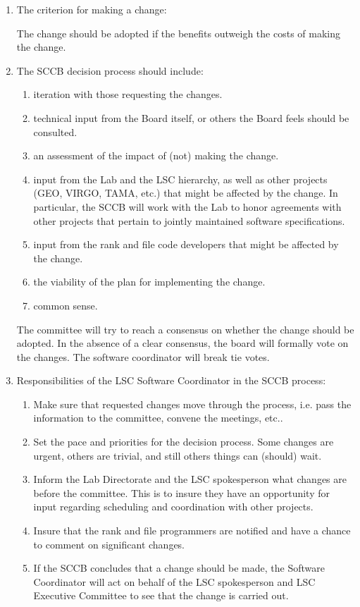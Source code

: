 \documentclass[]{ligodcc}
\begin{document}
\begin{enumerate}
\item
The criterion for making a change:

The change should be adopted if the benefits outweigh the costs of
making the change.

\item
The SCCB decision process should include:
\begin{enumerate}
   \item
   iteration with those requesting the changes.
   \item
   technical input from the Board itself, or others 
   the Board feels should be consulted.
   \item
   an assessment of the impact of (not) making the change. 
   \item
   input from the Lab and the LSC hierarchy, as well as 
   other projects (GEO, VIRGO, TAMA, etc.) that might be affected 
   by the change. In particular, the SCCB will work with the Lab to honor 
   agreements with other projects that pertain to jointly maintained
   software specifications.
   \item
   input from the rank and file code developers that might be affected
   by the change.
   \item
   the viability of the plan for implementing the change.
   \item
   common sense.
\end{enumerate}

The committee will try to reach a consensus on whether the change
should be adopted.  In the absence of a clear consensus, the board
will formally vote on the changes. The software coordinator will break
tie votes.

\item
Responsibilities of the LSC Software Coordinator in the SCCB process:
\begin{enumerate}
   \item
   Make sure that requested changes move through the process, i.e. 
   pass the information to the committee, convene the meetings, etc..
   \item
   Set the pace and priorities for the decision process. Some changes are 
   urgent, others are trivial, and still others things can (should) wait.
   \item
   Inform the Lab Directorate and the LSC  spokesperson what changes are 
   before the committee. This is to insure they have an opportunity for 
   input regarding scheduling and coordination with other projects.
   \item 
   Insure that the rank and file programmers are notified and have 
   a chance to comment on significant changes.
   \item
   If the SCCB concludes that a change should be made, the Software
   Coordinator will act on behalf of the LSC spokesperson and 
   LSC Executive Committee to see that the change is carried out.
\end{enumerate}
  
\end{enumerate}
\end{document}
